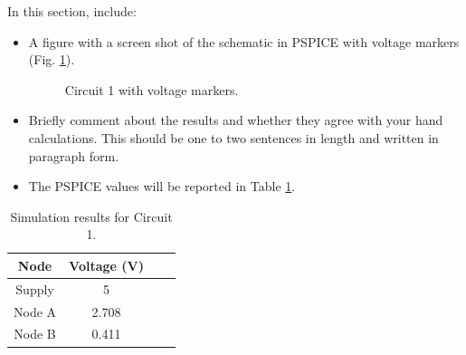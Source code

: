 \documentclass[11pt]{article}
\begin{document}
In this section, include: 
\begin{itemize}
	\item A figure with a screen shot of the schematic in PSPICE with  voltage markers (Fig. \ref{Fig:Circuit1VoltageMarkers}).  
	\begin{figure}[htbp]
		\centering
		\vspace{2in} %
		\caption{Circuit 1 with voltage markers. }
		\label{Fig:Circuit1VoltageMarkers}
	\end{figure}
	\item Briefly comment about the results and whether they agree with your hand calculations. This should be one to two sentences in length and written in paragraph form. 
	\item The PSPICE values will be reported  in Table \ref{Table:Circuit1}.
\end{itemize}
		\begin{table}[h!]
			\centering
			\caption{Simulation results for Circuit 1.}
			\label{Table:Circuit1}
		\begin{tabular}{|c||c|c|c|}
			\hline
			Node & Voltage (\si{\volt})  \\
			\hline
			Supply & 5 \\	 
			\hline 
			Node A & 2.708 \\	 
			\hline
			Node B & 0.411 \\	 
			\hline			
		\end{tabular}
		\end{table}	
\end{document}
